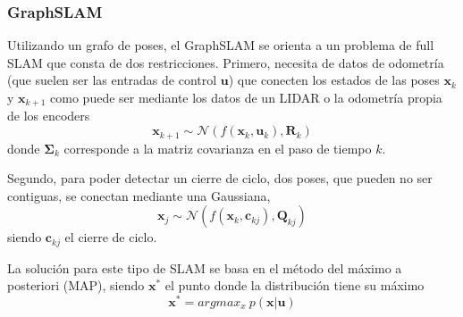 

\subsubsection{GraphSLAM}
Utilizando un grafo de poses, el GraphSLAM se orienta a un problema de full SLAM que consta de dos restricciones. Primero, necesita de datos de odometría (que suelen ser las entradas de control $\bm{u}$) que conecten los estados de las poses $\bm{x}_k$ y $\bm{x}_{k+1}$ como puede ser mediante los datos de un LIDAR o la odometría propia de los encoders
\begin{equation}
    \bm{x}_{k+1} \sim \mathcal{N}(f(\bm{x}_{k},\bm{u}_k),\bm{R}_k)
\end{equation}
donde $\bm{\Sigma}_k$ corresponde a la matriz covarianza en el paso de tiempo $k$.

Segundo, para poder detectar un cierre de ciclo, dos poses, que pueden no ser contiguas, se conectan mediante una Gaussiana,
\begin{equation}
    \bm{x}_j \sim \mathcal{N}(f(\bm{x}_k,\bm{c}_{kj}), \bm{Q}_{kj})
\end{equation}
siendo $\bm{c}_{kj}$ el cierre de ciclo.

La solución para este tipo de SLAM se basa en el método del máximo a posteriori (MAP), siendo $\bm{x}^*$ el punto donde la distribución tiene su máximo
\begin{equation}
    \bm{x}^* = argmax_x\ p(\bm{x}|\bm{u})
\end{equation}

